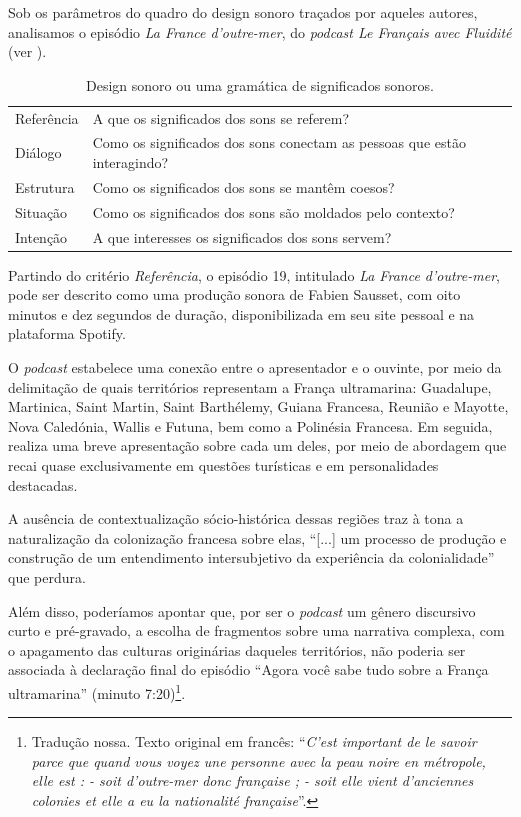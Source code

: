 \documentclass[portuguese]{textolivre}
\begin{document}
Sob os parâmetros do quadro do design sonoro traçados por aqueles autores, analisamos o episódio \textit{La France d’outre-mer}, do \textit{podcast Le Français avec Fluidité} (ver ).

\begin{table}[h!]
\centering
\begin{threeparttable}
\caption{Design sonoro ou uma gramática de significados sonoros.}
\label{tab01}
\begin{tabular}{p{2cm} p{9cm}}
\toprule
Referência & A que os significados dos sons se referem? \\
Diálogo & Como os significados dos sons conectam as pessoas que estão interagindo? \\
Estrutura & Como os significados dos sons se mantêm coesos? \\
Situação & Como os significados dos sons são moldados pelo contexto? \\
Intenção & A que interesses os significados dos sons servem? \\
\bottomrule
\end{tabular}
\end{threeparttable}
\end{table}

Partindo do critério \emph{Referência}, o episódio 19, intitulado \textit{La France d’outre-mer}, pode ser descrito como uma produção sonora de Fabien Sausset, com oito minutos e dez segundos de duração, disponibilizada em seu site pessoal e na plataforma Spotify.

O \textit{podcast} estabelece uma conexão entre o apresentador e o ouvinte, por meio da delimitação de quais territórios representam a França ultramarina: Guadalupe, Martinica, Saint Martin, Saint Barthélemy, Guiana Francesa, Reunião e Mayotte, Nova Caledónia, Wallis e Futuna, bem como a Polinésia Francesa. Em seguida, realiza uma breve apresentação sobre cada um deles, por meio de abordagem que recai quase exclusivamente em questões turísticas e em personalidades destacadas.

A ausência de contextualização sócio-histórica dessas regiões traz à tona a naturalização da colonização francesa sobre elas, “[...] um processo de produção e construção de um entendimento intersubjetivo da experiência da colonialidade” \cite[p. 85]{veronelli_sobre_2021} que perdura.

Além disso, poderíamos apontar que, por ser o \textit{podcast} um gênero discursivo curto e pré-gravado, a escolha de fragmentos sobre uma narrativa complexa, com o apagamento das culturas originárias daqueles territórios, não poderia  ser associada à declaração final do episódio “Agora você sabe tudo sobre a França ultramarina” (minuto 7:20)\footnote{Tradução nossa. Texto original em francês: “\textit{C’est important de le savoir parce que quand vous voyez une personne avec la peau noire en métropole, elle est : - soit d’outre-mer donc française ; - soit elle vient d’anciennes colonies et elle a eu la nationalité française}”.}.
\end{document}
